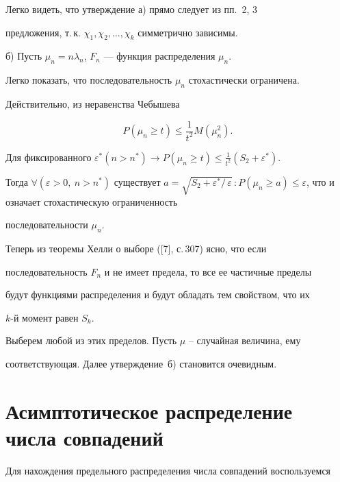 \begin{pf}


Легко видеть, что утверждение а) прямо следует из пп.~2, 3


предложения, т.\,к. $\chi_1,\chi_2,\dotsc ,\chi_k$ симметрично зависимы.





б) Пусть $\mu_n=n\lambda_n$, $F_n$ --- функция распределения $\mu_n$.


Легко показать, что последовательность $\mu_n$ стохастически ограничена.


Действительно, из неравенства Чебышева


$$


P(\mu_n \ge t) \leq \frac{1}{t^2}M(\mu_n^2).


$$


Для фиксированного $\varepsilon^*(n>n^*)


\rightarrow P(\mu_n \ge t) \leq \frac{1}{t^2}( S_2+\varepsilon^*).$


Тогда $\forall (\varepsilon>0,\ n>n^*)$ существует $a=


\sqrt{S_2+\varepsilon^*/\,\varepsilon}\, : P(\mu_n \ge a) \leq


\varepsilon$, что и означает стохастическую ограниченность


последовательности $\mu_n$.


Теперь из теоремы Хелли о выборе ([7], с.\,307) ясно, что если


последовательность $F_n$ и не имеет предела, то все ее частичные пределы


будут функциями распределения и будут обладать тем свойством, что их


$k$-й момент равен $S_k$.


Выберем любой из этих пределов. Пусть $\mu$ -- случайная величина, ему


соответствующая. Далее утверждение~б) становится очевидным.


\end{pf}





\section{Асимптотическое распределение числа совпадений}





Для нахождения предельного распределения числа совпадений воспользуемся



